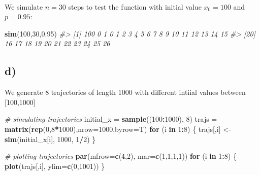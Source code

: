 \documentclass[]{article}
\newenvironment{Shaded}{\begin{snugshade}}{\end{snugshade}}
\newcommand{\CommentTok}[1]{\textcolor[rgb]{0.56,0.35,0.01}{\textit{#1}}}
\newcommand{\ControlFlowTok}[1]{\textcolor[rgb]{0.13,0.29,0.53}{\textbf{#1}}}
\newcommand{\DataTypeTok}[1]{\textcolor[rgb]{0.13,0.29,0.53}{#1}}
\newcommand{\DecValTok}[1]{\textcolor[rgb]{0.00,0.00,0.81}{#1}}
\newcommand{\FloatTok}[1]{\textcolor[rgb]{0.00,0.00,0.81}{#1}}
\newcommand{\KeywordTok}[1]{\textcolor[rgb]{0.13,0.29,0.53}{\textbf{#1}}}
\newcommand{\NormalTok}[1]{#1}
\newcommand{\OperatorTok}[1]{\textcolor[rgb]{0.81,0.36,0.00}{\textbf{#1}}}
\newcommand{\StringTok}[1]{\textcolor[rgb]{0.31,0.60,0.02}{#1}}
\begin{document}
~

We simulate \(n=30\) steps to test the function with initial value
\(x_{0} = 100\) and \(p=0.95\):

\begin{Shaded}
\begin{Highlighting}[]
\KeywordTok{sim}\NormalTok{(}\DecValTok{100}\NormalTok{,}\DecValTok{30}\NormalTok{,}\FloatTok{0.95}\NormalTok{)}
\CommentTok{#>  [1] 100   0   1   0   1   2   3   4   5   6   7   8   9  10  11  12  13  14  15}
\CommentTok{#> [20]  16  17  18  19  20  21  22  23  24  25  26}
\end{Highlighting}
\end{Shaded}

\hypertarget{d-1}{%
\subsection{d)}\label{d-1}}

We generate 8 trajectories of length 1000 with different intiial values
between {[}100,1000{]}

\begin{Shaded}
\begin{Highlighting}[]
\CommentTok{# simulating trajectories}
\NormalTok{initial_x =}\StringTok{ }\KeywordTok{sample}\NormalTok{((}\DecValTok{100}\OperatorTok{:}\DecValTok{1000}\NormalTok{), }\DecValTok{8}\NormalTok{)}
\NormalTok{trajs =}\StringTok{ }\KeywordTok{matrix}\NormalTok{(}\KeywordTok{rep}\NormalTok{(}\DecValTok{0}\NormalTok{,}\DecValTok{8}\OperatorTok{*}\DecValTok{1000}\NormalTok{),}\DataTypeTok{nrow=}\DecValTok{1000}\NormalTok{,}\DataTypeTok{byrow=}\NormalTok{T)}
\ControlFlowTok{for}\NormalTok{ (i }\ControlFlowTok{in} \DecValTok{1}\OperatorTok{:}\DecValTok{8}\NormalTok{) \{}
\NormalTok{    trajs[,i] <-}\StringTok{ }\KeywordTok{sim}\NormalTok{(initial_x[i], }\DecValTok{1000}\NormalTok{, }\DecValTok{1}\OperatorTok{/}\DecValTok{2}\NormalTok{)}
\NormalTok{\}}
\end{Highlighting}
\end{Shaded}

\begin{Shaded}
\begin{Highlighting}[]
\CommentTok{# plotting trajectories}
\KeywordTok{par}\NormalTok{(}\DataTypeTok{mfrow=}\KeywordTok{c}\NormalTok{(}\DecValTok{4}\NormalTok{,}\DecValTok{2}\NormalTok{), }\DataTypeTok{mar=}\KeywordTok{c}\NormalTok{(}\DecValTok{1}\NormalTok{,}\DecValTok{1}\NormalTok{,}\DecValTok{1}\NormalTok{,}\DecValTok{1}\NormalTok{))}
\ControlFlowTok{for}\NormalTok{ (i }\ControlFlowTok{in} \DecValTok{1}\OperatorTok{:}\DecValTok{8}\NormalTok{) \{}
    \KeywordTok{plot}\NormalTok{(trajs[,i], }\DataTypeTok{ylim=}\KeywordTok{c}\NormalTok{(}\DecValTok{0}\NormalTok{,}\DecValTok{1001}\NormalTok{))}
\NormalTok{\}}
\end{Highlighting}
\end{Shaded}
\end{document}

